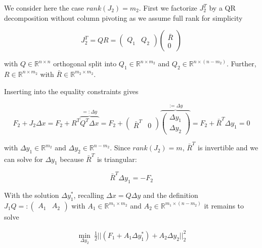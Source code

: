 \documentclass{scrartcl}[12pt, halfparskip]
\numberwithin{equation}{section}
\numberwithin{figure}{section}
\numberwithin{table}{section}
\begin{document}
We consider here the case $rank(J_2)=m_2$. First we factorize $J_2^T$ by a QR decomposition without column pivoting as we assume full rank for simplicity

\begin{equation}
	J_2^T = Q R = 
	\begin{pmatrix}
		Q_1 & Q_2
	\end{pmatrix}
	\begin{pmatrix}
		\bar{R} \\
		0
	\end{pmatrix}
\end{equation}

with $Q \in \mathbb{R}^{n \times n}$ orthogonal split into $Q_1 \in \mathbb{R}^{n \times m_2}$ and $Q_2 \in \mathbb{R}^{n \times (n-m_2)}$. Further, $R \in \mathbb{R}^{n \times m_2}$ with $\bar{R} \in \mathbb{R}^{m_2 \times m_2}$.

Inserting into the equality constraints gives

\begin{equation}
	F_2 + J_2 \Delta x = F_2 + R^T \overbrace{Q^T \Delta x}^{=: \Delta y} = F_2 +
	\begin{pmatrix}
		\bar{R}^T & 0
	\end{pmatrix} 
	\overbrace{
	\begin{pmatrix}
		\Delta y_1 \\
		\Delta y_2
	\end{pmatrix}}^{:= \Delta y} = F_2 + \bar{R}^T \Delta y_1 = 0
\end{equation}

with $\Delta y_1 \in \mathbb{R}^{m_2}$ and $\Delta y_2 \in \mathbb{R}^{n-m_2}$. Since $rank(J_2)=m$, $\bar{R}^T$ is invertible and we can solve for $\Delta y_1$ because $\bar{R}^T$ is triangular:

\begin{equation}
	\bar{R}^T \Delta y_1 = -F_2
\end{equation}

With the solution $\Delta y_1^*$, recalling $\Delta x = Q \Delta y$ and the definition $J_1 Q =: \begin{pmatrix} A_1 & A_2 \end{pmatrix}$ with $A_1 \in \mathbb{R}^{m_1 \times m_2}$ and $A_2 \in \mathbb{R}^{m_1 \times (n-m_2)}$ it remains to solve

\begin{align}
	\min_{\Delta y_2} \ \frac{1}{2} || (F_1 + A_1 \Delta y_1^*) + A_2 \Delta y_2 ||_2^2
\end{align}
\end{document}
